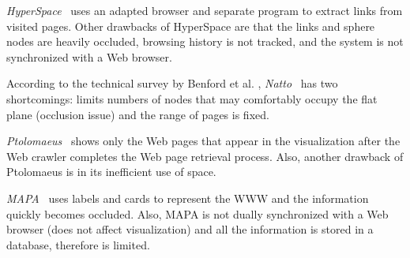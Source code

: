 \documentclass[10pt,psfig]{article}
\begin{document}
{%
{\em HyperSpace}~\cite{wdbh-95} uses an adapted browser and separate program to extract links from visited pages.  Other drawbacks of HyperSpace are that the links and sphere nodes are heavily occluded, browsing history is not tracked, and the system is not synchronized with a Web browser.

According to the technical survey by Benford et al. \cite{survey-99}, {\em Natto}~\cite{sm97}  has two shortcomings: limits numbers of nodes that may comfortably occupy the flat plane (occlusion issue) and the range of pages is fixed.

{\em Ptolomaeus}~\cite{blv98} shows only the Web pages that appear in the visualization after the Web crawler completes the Web page retrieval process.
Also, another drawback of Ptolomaeus is in its inefficient use of space.

{\em MAPA}~\cite{dk98} uses labels and cards to represent the WWW and the information quickly becomes occluded.
Also, MAPA is not dually synchronized with a Web browser (does not affect visualization) and all the information is stored in a database, therefore is limited.

}
\end{document}
